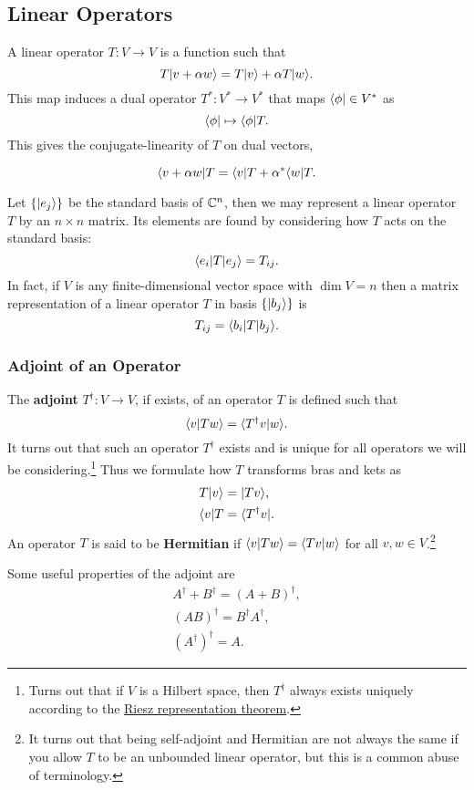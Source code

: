 \subsection{Linear Operators}

A linear operator $T:V\to V$ is a function such that
$$T\lvert v + \alpha w \rangle = T\lvert v \rangle + \alpha T \lvert w \rangle.$$
This map induces a dual operator $T^* : V^* \to V^*$ that maps $\langle \phi \rvert\in V^*$ as
$$\langle \phi \rvert \mapsto \langle \phi \rvert T.$$ This gives the conjugate-linearity of $T$ on dual vectors,

$$\langle v + \alpha w \rvert T = \langle v \rvert T + \alpha^* \langle w \rvert T.$$

\begin{example}
    Let $\{\lvert e_j \rangle\}$ be the standard basis of $\mathbb{C}^n$, then we may represent a linear operator $T$ by
    an $n\times n$ matrix. Its elements are found by considering how $T$ acts on the standard basis:
    $$\langle e_i \rvert T \lvert e_j \rangle = T_{ij}.$$ In fact, if $V$ is any finite-dimensional vector space with $\dim V = n$ then a matrix representation of a linear operator $T$ in basis $\{\lvert b_j \rangle\}$ is
    $$T_{ij} = \langle b_i \rvert T \lvert b_j \rangle.$$
\end{example}

\subsubsection{Adjoint of an Operator}
The \textbf{adjoint} $T^\dagger:V\to V$, if exists, of an operator $T$ is defined such that
$$\langle v\vert Tw \rangle = \langle T^\dagger v\vert w \rangle.$$
It turns out that such an operator $T^\dagger$ exists and is unique for all operators we will be considering.\footnote{
    Turns out that if $V$ is a Hilbert space, then $T^\dagger$ always exists uniquely according to the \href{https://en.wikipedia.org/wiki/Riesz_representation_theorem}{Riesz representation theorem}.
} Thus we formulate how $T$ transforms bras and kets as
\begin{align*}
    T\lvert v \rangle &= \lvert T v \rangle, \\
    \langle v \rvert T &= \langle T^\dagger v \rvert.
\end{align*}
An operator $T$ is said to be \textbf{Hermitian} if $\langle v\vert Tw \rangle = \langle Tv\vert w \rangle$ for all $v,w\in V$.\footnote{It turns out that being self-adjoint and Hermitian are not always the same if you allow $T$ to be an unbounded linear operator, but this is a common abuse of terminology.}

Some useful properties of the adjoint are
\begin{equation}
    \begin{gathered}
        A^\dagger + B^\dagger = (A + B)^\dagger, \\
        (AB)^\dagger = B^\dagger A^\dagger, \\
        (A^\dagger)^\dagger = A.
    \end{gathered}
\end{equation}

